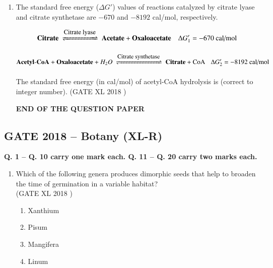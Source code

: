 \documentclass[14pt]{extarticle}
\begin{document}
\begin{flushleft}
\begin{enumerate}[leftmargin=*]
\item The standard free energy ($\Delta G'$) values of reactions catalyzed by citrate lyase and citrate synthetase are $-670$ and $-8192$ cal/mol, respectively.

\[
\mathbf{Citrate}
\ \xrightleftharpoons[\text{}]{\text{\small Citrate lyase}}\
\mathbf{Acetate} + \mathbf{Oxaloacetate}
\quad \Delta G'_1 = -670 \ \text{cal/mol}
\]

\[
\mathbf{Acetyl\mbox{-}CoA} + \mathbf{Oxaloacetate} + H_2O
\ \xrightleftharpoons[\text{}]{\text{\small Citrate synthetase}}\
\mathbf{Citrate} + \mathrm{CoA}
\hspace{0.3cm} \Delta G'_2 = -8192 \ \text{cal/mol}
\]

The standard free energy (in cal/mol) of acetyl-CoA hydrolysis is \underline{\hspace{2cm}} (correct to integer number).
\hfill(GATE XL 2018 )\\

\begin{center}
\textbf{END OF THE QUESTION PAPER}
\end{center}

\end{enumerate}
\clearpage



\begin{center}   
\section*{GATE 2018 – Botany (XL-R)}
\noindent\textbf{Q. 1 -- Q. 10 carry one mark each. Q. 11 -- Q. 20 carry two marks each.}
\end{center}
\begin{enumerate}[leftmargin=*]
 \item Which of the following genera produces dimorphic seeds that help to broaden the time of germination in a variable habitat?\\
 \hfill(GATE XL 2018 )
    \begin{multicols}{2}
    \begin{enumerate}
        \item Xanthium
        \item Pisum
        \item Mangifera
        \item Linum
    \end{enumerate}
    \end{multicols}


\end{enumerate}
\end{flushleft}
\end{document}
